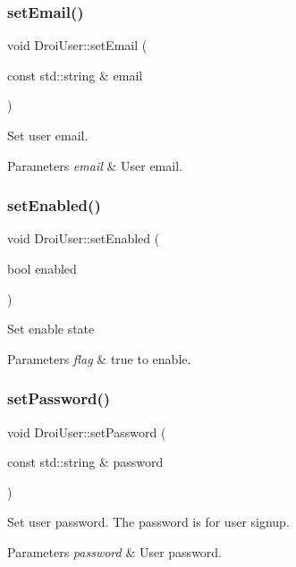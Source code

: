 \subsubsection{\texorpdfstring{set\+Email()}{setEmail()}}
{\footnotesize\ttfamily void Droi\+User\+::set\+Email (\begin{DoxyParamCaption}\item[{const std\+::string \&}]{email }\end{DoxyParamCaption})}

Set user email. 
\begin{DoxyParams}{Parameters}
{\em email} & User email. \\
\hline
\end{DoxyParams}
\mbox{\label{class_droi_user_ad4142478f0499ff7eefbba8a7654efce}} 
\subsubsection{\texorpdfstring{set\+Enabled()}{setEnabled()}}
{\footnotesize\ttfamily void Droi\+User\+::set\+Enabled (\begin{DoxyParamCaption}\item[{bool}]{enabled }\end{DoxyParamCaption})}

Set enable state 
\begin{DoxyParams}{Parameters}
{\em flag} & true to enable. \\
\hline
\end{DoxyParams}
\mbox{\label{class_droi_user_afdc2427b453225d6bc014a5a2bb69086}} 
\subsubsection{\texorpdfstring{set\+Password()}{setPassword()}}
{\footnotesize\ttfamily void Droi\+User\+::set\+Password (\begin{DoxyParamCaption}\item[{const std\+::string \&}]{password }\end{DoxyParamCaption})}

Set user password. The password is for user signup. 
\begin{DoxyParams}{Parameters}
{\em password} & User password. \\
\hline
\end{DoxyParams}
\mbox{\label{class_droi_user_a3b208995b25dc47e72d1fa25b5a0845c}} 

